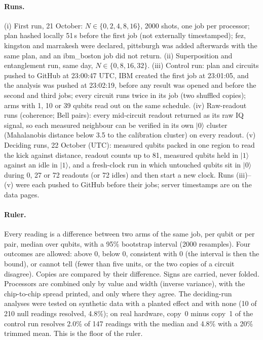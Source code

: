 \documentclass[reprint,amsmath,amssymb,aps,superscriptaddress,nofootinbib]{revtex4-2}
\begin{document}
\paragraph*{Runs.} (i) First run, 21 October: $N\in\{0,2,4,8,16\}$, 2000 shots, one job per processor; plan hashed locally 51\,s before the first job (not externally timestamped); fez, kingston and marrakesh were declared, pittsburgh was added afterwards with the same plan, and an ibm\_boston job did not return. (ii) Superposition and entanglement run, same day, $N\in\{0,8,16,32\}$. (iii) Control run: plan and circuits pushed to GitHub at 23:00:47 UTC, IBM created the first job at 23:01:05, and the analysis was pushed at 23:02:19, before any result was opened and before the second and third jobs; every circuit runs twice in its job (two shuffled copies); arms with 1, 10 or 39 qubits read out on the same schedule. (iv) Raw-readout runs (coherence; Bell pairs): every mid-circuit readout returned as its raw IQ signal, so each measured neighbour can be verified in its own $|0\rangle$ cluster (Mahalanobis distance below 3.5 to the calibration cluster) on every readout. (v) Deciding runs, 22 October (UTC): measured qubits packed in one region to read the kick against distance, readout counts up to 81, measured qubits held in $|1\rangle$ against an idle in $|1\rangle$, and a fresh-clock run in which untouched qubits sit in $|0\rangle$ during 0, 27 or 72 readouts (or 72 idles) and then start a new clock. Runs (iii)--(v) were each pushed to GitHub before their jobs; server timestamps are on the data pages.

\paragraph*{Ruler.} Every reading is a difference between two arms of the same job, per qubit or per pair, median over qubits, with a 95\% bootstrap interval (2000 resamples). Four outcomes are allowed: above 0, below 0, consistent with 0 (the interval is then the bound), or cannot tell (fewer than five units, or the two copies of a circuit disagree). Copies are compared by their difference. Signs are carried, never folded. Processors are combined only by value and width (inverse variance), with the chip-to-chip spread printed, and only where they agree. The deciding-run analyses were tested on synthetic data with a planted effect and with none (10 of 210 null readings resolved, 4.8\%); on real hardware, copy~0 minus copy~1 of the control run resolves 2.0\% of 147 readings with the median and 4.8\% with a 20\% trimmed mean. This is the floor of the ruler.
\end{document}
